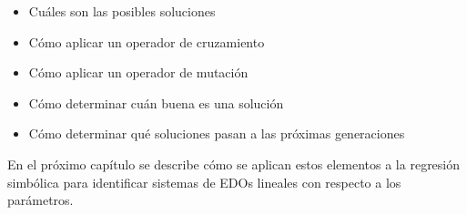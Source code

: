 \begin{itemize}
    \item Cuáles son las posibles soluciones
    \item Cómo aplicar un operador de cruzamiento
    \item Cómo aplicar un operador de mutación
    \item Cómo determinar cuán buena es una solución
    \item Cómo determinar qué soluciones pasan a las próximas generaciones
\end{itemize}

En el próximo capítulo se describe cómo se aplican estos elementos a la regresión simbólica para identificar sistemas de EDOs lineales con respecto a los parámetros.
